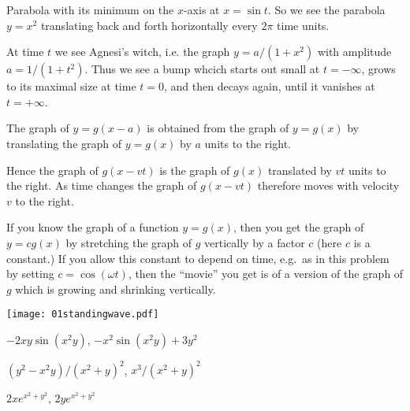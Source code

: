 \item[{\bfseries(III5.14g)}]

Parabola with its minimum on the $x$-axis at $x=\sin t$.
So we see the parabola $y=x^2$ translating back and forth horizontally
every $2\pi$ time units.
\bigskip

\item[{\bfseries(III5.14j)}]

At time $t$ we see Agnesi's witch, i.e. the graph $y= a/(1+x^2)$
with amplitude $a=1/(1+t^2)$.  Thus we see a bump whcich starts out small
 at $t=-\infty$, grows to its maximal size at time $t=0$, and then decays
again, until it vanishes at $t=+\infty$.
\bigskip

\item[{\bfseries(III5.16)}]

The graph of $y=g(x-a)$ is obtained from the graph of $y=g(x)$ by
translating the graph of $y=g(x)$ by $a$ units to the right.

Hence the graph of $g(x-vt)$ is the graph of $g(x)$ translated by $vt$
units to the right.  As time changes the graph of $g(x-vt)$ therefore
moves with velocity $v$ to the right.
\bigskip

\item[{\bfseries(III5.17)}]

If you know the graph of a function $y=g(x)$, then you get
the graph of $y=cg(x)$ by stretching the graph of $g$ vertically by
a factor $c$ (here $c$ is a constant.)
If you allow this constant to depend on time, e.g.\ as in this
problem by setting $c=\cos(\omega t)$, then the ``movie'' you get is of a
version of the graph of $g$ which is growing and shrinking vertically.

\begin{center}
    \texttt{[image: 01standingwave.pdf]}
\end{center}
\bigskip

\item[{\bfseries(IV3.2b)}]

$-2xy\sin(x^2y)$, $-x^2\sin(x^2y)+3y^2$
\bigskip

\item[{\bfseries(IV3.2c)}]

$(y^2-x^2y)/(x^2+y)^2$, $x^3/(x^2+y)^2$
\bigskip

\item[{\bfseries(IV3.2g)}]

$2xe^{x^2+y^2}$, $2ye^{x^2+y^2}$
\bigskip

\item[{\bfseries(IV3.2h)}]

